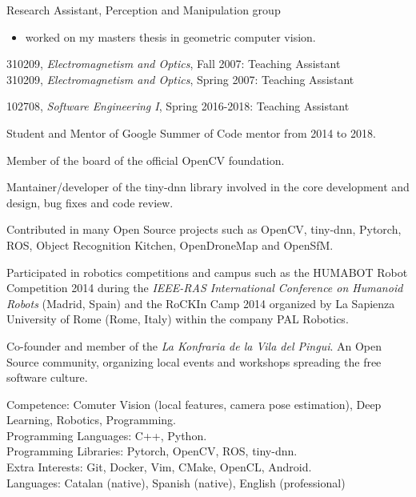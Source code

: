 \documentclass{article}
\begin{document}
\begin{llist}
Research Assistant, Perception and Manipulation group
\vspace{-0.33cm}
\begin{itemize}
 \item worked on my masters thesis in geometric computer vision.
\end{itemize}


\label{Teaching Experience}

310209, {\em Electromagnetism and Optics}, Fall 2007: Teaching Assistant\\
310209, {\em Electromagnetism and Optics}, Spring 2007: Teaching Assistant

102708, {\em Software Engineering I}, Spring 2016-2018: Teaching Assistant\\

\vspace{-0.4cm}

Student and Mentor of Google Summer of Code mentor from 2014 to 2018.

Member of the board of the official OpenCV foundation.

Mantainer/developer of the tiny-dnn library involved in the core development and design, bug fixes and code review.

Contributed in many Open Source projects such as OpenCV, tiny-dnn, Pytorch, ROS, Object Recognition Kitchen, OpenDroneMap and OpenSfM.

Participated in robotics competitions and campus such as the HUMABOT Robot Competition 2014 during the \textit{IEEE-RAS International Conference on Humanoid Robots} (Madrid, Spain) and the RoCKIn Camp 2014 organized by  La Sapienza University of Rome (Rome, Italy) within the company PAL Robotics.

Co-founder and member of the \textit{La Konfraria de la Vila del Pingui}. An Open Source community, organizing local events and workshops spreading the free software culture.


\label{Skills}
Competence: Comuter Vision (local features, camera pose estimation), Deep Learning, Robotics, Programming.\\
Programming Languages: C++, Python.\\
Programming Libraries: Pytorch, OpenCV, ROS, tiny-dnn. \\
Extra Interests: Git, Docker, Vim, CMake, OpenCL, Android. \\
Languages: Catalan (native), Spanish (native), English  (professional)



\end{llist}
\end{document}
